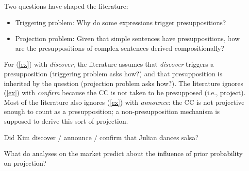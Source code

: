 \documentclass[11pt,fleqn]{article}
\newcommand{\6}{\mbox{$[\hspace*{-.6mm}[$}}
\newcommand{\9}{\mbox{$]\hspace*{-.6mm}]$}}
\begin{document}
Two questions have shaped the literature:

\begin{itemize}

\item Triggering problem: Why do some expressions trigger presuppositions?

\item Projection problem: Given that simple sentences have presuppositions, how are the presuppositions of complex sentences derived compositionally?

\end{itemize}

For (\ref{ex}) with {\em discover}, the literature assumes that {\em discover} triggers a presupposition (triggering problem asks how?) and that presupposition is inherited by the question (projection problem asks how?). The literature ignores (\ref{ex}) with {\em confirm} because the CC is not taken to be presupposed (i.e., project). Most of the literature also ignores (\ref{ex}) with {\em announce}: the CC is not projective enough to count as a presupposition; a non-presupposition mechanism is supposed to derive this sort of projection.

\begin{exe}
\ex\label{ex} Did Kim discover / announce / confirm that Julian dances salsa?
\end{exe}

What do analyses on the market predict about the influence of prior probability on projection?

\subsubsection{\citealt{heim83}}
\end{document}
